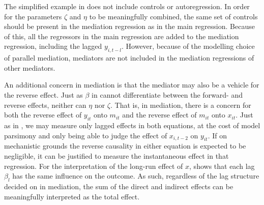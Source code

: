 \begin{figure}[htbp]
\begin{subfigure}[t]{0.32\textwidth}
        \label{fig:methods:mediation_forms:simultaneous}
    \end{subfigure}
\end{figure}

The simplified example in  does not include controls or autoregression. In order for the parameters $\zeta$ and $\eta$
to be meaningfully combined, the same set of controls should be present in the mediation regression as in the main
regression. Because of this, all the regressors in the main regression are added to the mediation regression, including
the lagged $y_{i,t-l}$. However, because of the modelling choice of parallel mediation, mediators are not included
in the mediation regressions of other mediators.

An additional concern in mediation is that the mediator may also be a vehicle for the reverse effect.
Just as $\beta$ in  cannot differentiate between the forward- and reverse effects,
neither can $\eta$ nor $\zeta$. That is, in mediation, there is a concern for both the reverse effect of $y_{it}$ onto
$m_{it}$ and the reverse effect of $m_{it}$ onto $x_{it}$. Just as in ,
we may measure only lagged effects in both equations, at the cost of model parsimony and only being able to judge the
effect of $x_{i,t-2}$ on $y_{it}$.
If on mechanistic grounds the reverse causality in either equation is expected to be negligible, it can be justified
to measure the instantaneous effect in that regression.
For the interpretation of the long-run effect of $x$,  shows that each lag $\beta_l$
has the same influence on the outcome. As such, regardless of the lag structure decided on in mediation, the sum of the
direct and indirect effects can be meaningfully interpreted as the total effect.

